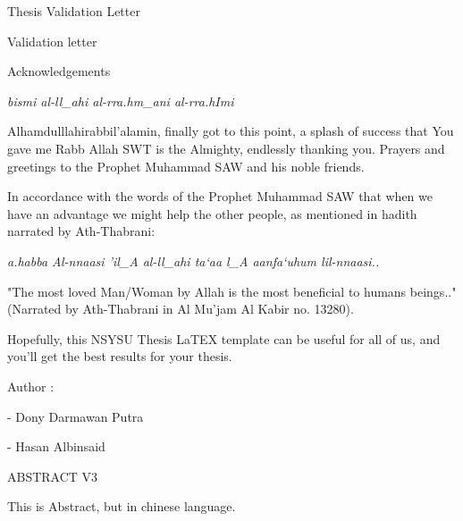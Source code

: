 \documentclass[12pt, twoside , openright]{book}
\begin{document}
\begin{center}
	{\chinnesesize Thesis Validation Letter }
\end{center}
Validation letter
\newpage
\mbox{}
\newpage


{}
\begin{center}
	{\chinnesesize Acknowledgements}
\end{center}
\begin{center}
	\textit{bismi al-ll\_ahi al-rra.hm\_ani al-rra.hImi}
\end{center}

Alhamdulllahirabbil'alamin, finally got to this point, a splash of success that You gave me Rabb Allah SWT is the Almighty, endlessly thanking you. Prayers and greetings to the Prophet Muhammad SAW and his noble friends.  

In accordance with the words of the Prophet Muhammad SAW that when we have an advantage we might help the other people, as mentioned in hadith narrated by Ath-Thabrani:

\begin{center}
	\textit{a.habba Al-nnaasi 'il\_A al-ll\_ahi ta`aa l\_A aanfa`uhum lil-nnaasi..}
\end{center}


"The most loved Man/Woman by Allah is the most beneficial to humans  beings.." (Narrated by Ath-Thabrani in Al Mu'jam Al Kabir no. 13280).

Hopefully, this NSYSU Thesis LaTEX template can be useful for all of us, and you'll get the best results for your thesis.

\noindent
Author :

\vspace{-2em}
- Dony Darmawan Putra

\vspace{-2em}
- Hasan Albinsaid

\newpage
\mbox{}
\newpage




ABSTRACT V3
{}
\begin{center}
	{\chinnesesize {}}
\end{center}
This is Abstract, but in chinese language. \blindtext[1]
\newpage
\mbox{}
\newpage
\end{document}
